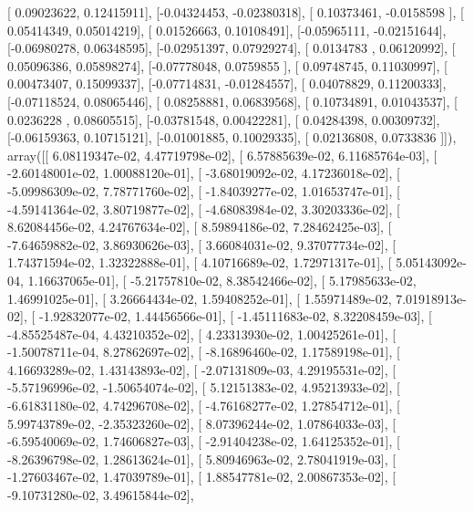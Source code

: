 \documentclass{article}
\begin{document}
       [ 0.09023622,  0.12415911],
       [-0.04324453, -0.02380318],
       [ 0.10373461, -0.0158598 ],
       [ 0.05414349,  0.05014219],
       [ 0.01526663,  0.10108491],
       [-0.05965111, -0.02151644],
       [-0.06980278,  0.06348595],
       [-0.02951397,  0.07929274],
       [ 0.0134783 ,  0.06120992],
       [ 0.05096386,  0.05898274],
       [-0.07778048,  0.0759855 ],
       [ 0.09748745,  0.11030997],
       [ 0.00473407,  0.15099337],
       [-0.07714831, -0.01284557],
       [ 0.04078829,  0.11200333],
       [-0.07118524,  0.08065446],
       [ 0.08258881,  0.06839568],
       [ 0.10734891,  0.01043537],
       [ 0.0236228 ,  0.08605515],
       [-0.03781548,  0.00422281],
       [ 0.04284398,  0.00309732],
       [-0.06159363,  0.10715121],
       [-0.01001885,  0.10029335],
       [ 0.02136808,  0.0733836 ]]), array([[  6.08119347e-02,   4.47719798e-02],
       [  6.57885639e-02,   6.11685764e-03],
       [ -2.60148001e-02,   1.00088120e-01],
       [ -3.68019092e-02,   4.17236018e-02],
       [ -5.09986309e-02,   7.78771760e-02],
       [ -1.84039277e-02,   1.01653747e-01],
       [ -4.59141364e-02,   3.80719877e-02],
       [ -4.68083984e-02,   3.30203336e-02],
       [  8.62084456e-02,   4.24767634e-02],
       [  8.59894186e-02,   7.28462425e-03],
       [ -7.64659882e-02,   3.86930626e-03],
       [  3.66084031e-02,   9.37077734e-02],
       [  1.74371594e-02,   1.32322888e-01],
       [  4.10716689e-02,   1.72971317e-01],
       [  5.05143092e-04,   1.16637065e-01],
       [ -5.21757810e-02,   8.38542466e-02],
       [  5.17985633e-02,   1.46991025e-01],
       [  3.26664434e-02,   1.59408252e-01],
       [  1.55971489e-02,   7.01918913e-02],
       [ -1.92832077e-02,   1.44456566e-01],
       [ -1.45111683e-02,   8.32208459e-03],
       [ -4.85525487e-04,   4.43210352e-02],
       [  4.23313930e-02,   1.00425261e-01],
       [ -1.50078711e-04,   8.27862697e-02],
       [ -8.16896460e-02,   1.17589198e-01],
       [  4.16693289e-02,   1.43143893e-02],
       [ -2.07131809e-03,   4.29195531e-02],
       [ -5.57196996e-02,  -1.50654074e-02],
       [  5.12151383e-02,   4.95213933e-02],
       [ -6.61831180e-02,   4.74296708e-02],
       [ -4.76168277e-02,   1.27854712e-01],
       [  5.99743789e-02,  -2.35323260e-02],
       [  8.07396244e-02,   1.07864033e-03],
       [ -6.59540069e-02,   1.74606827e-03],
       [ -2.91404238e-02,   1.64125352e-01],
       [ -8.26396798e-02,   1.28613624e-01],
       [  5.80946963e-02,   2.78041919e-03],
       [ -1.27603467e-02,   1.47039789e-01],
       [  1.88547781e-02,   2.00867353e-02],
       [ -9.10731280e-02,   3.49615844e-02],
\end{document}
